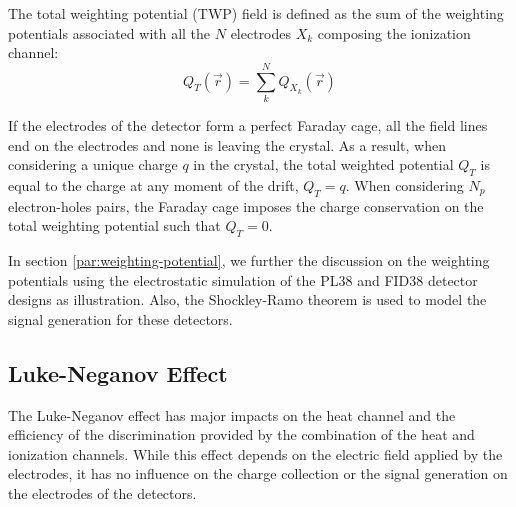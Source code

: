 
The total weighting potential (TWP)  field is defined as the sum of the weighting potentials associated with all the $N$ electrodes $X_k$ composing the ionization channel:
\begin{equation}
\label{eq:twp}
Q_T (\vec{r}) = \sum_k^N Q_{X_k} (\vec{r})
\end{equation}

If the electrodes of the detector form a perfect Faraday cage, all the field lines end on the electrodes and none is leaving the crystal. As a result, when considering a unique charge $q$ in the crystal, the total weighted potential $Q_T$ is equal to the charge at any moment of the drift, $Q_T = q$. When considering $N_p$ electron-holes pairs, the Faraday cage imposes the charge conservation on the total weighting potential such that $Q_T = 0$.

In section \ref{par:weighting-potential}, we further the discussion on the weighting potentials using the electrostatic simulation of the PL38 and FID38 detector designs as illustration. Also, the Shockley-Ramo theorem is used to model the signal generation for these detectors.



\subsection{Luke-Neganov Effect}
\label{par:luke-neganov}


The Luke-Neganov effect has major impacts on the heat channel and the efficiency of the discrimination provided by the combination of the heat and ionization channels. While this effect depends on the electric field applied by the electrodes, it has no influence on the charge collection or the signal generation on the electrodes of the detectors.  

